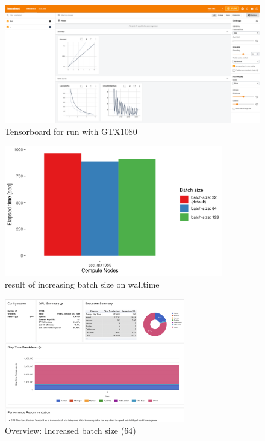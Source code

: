 \documentclass[12pt, a4paper, hidelinks]{article}
\begin{document}
\begin{figure}[H]
\centering
\includegraphics[width=1\textwidth]{./assets/scap_gtx1080_tensorboard_14615343}
\caption*{Tensorboard for run with GTX1080}
\label{fig:scap_gtx1080_tensorboard_14615343}
\end{figure}

\begin{figure}[H]
\centering
\includegraphics[width=0.85\textwidth]{./assets/sacct_barplot_by_nodes_batch-size-effect}
\caption*{result of increasing batch size on walltime}
\label{fig:sacct_barplot_by_nodes_batch-size-effect}
\end{figure}

\begin{figure}[H]
\centering
\includegraphics[width=0.7\textwidth]{./assets/scap_gtx1080_profiler-torch_batch-size-64_14650758}
\caption[test]{Overview: Increased batch size (64)}
\label{fig:scap_gtx1080_profiler-torch_batch-size-64_14650758}
\end{figure}
\end{document}
